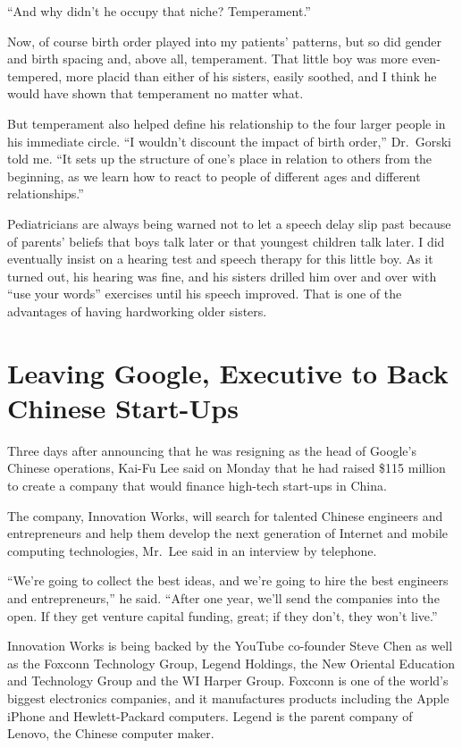﻿\documentclass[12pt]{article}
\begin{document}
``And why didn't he occupy that niche? Temperament.''

Now, of course birth order played into my patients' patterns, but so did gender and birth spacing
and, above all, temperament. That little boy was more even-tempered, more placid than either of his
sisters, easily soothed, and I think he would have shown that temperament no matter what.

But temperament also helped define his relationship to the four larger people in his immediate
circle. ``I wouldn't discount the impact of birth order,'' Dr.~Gorski told me. ``It sets up the
structure of one's place in relation to others from the beginning, as we learn how to react to
people of different ages and different relationships.''

Pediatricians are always being warned not to let a speech delay slip past because of parents'
beliefs that boys talk later or that youngest children talk later. I did eventually insist on a
hearing test and speech therapy for this little boy. As it turned out, his hearing was fine, and his
sisters drilled him over and over with ``use your words'' exercises until his speech improved. That
is one of the advantages of having hardworking older sisters.

\section{Leaving Google, Executive to Back Chinese Start-Ups}

Three days after announcing that he was resigning as the head of Google's Chinese operations, Kai-Fu
Lee said on Monday that he had raised \$115 million to create a company that would finance high-tech
start-ups in China.

The company, Innovation Works, will search for talented Chinese engineers and entrepreneurs and help
them develop the next generation of Internet and mobile computing technologies, Mr.~Lee said in an
interview by telephone.

``We're going to collect the best ideas, and we're going to hire the best engineers and
entrepreneurs,'' he said. ``After one year, we'll send the companies into the open. If they get
venture capital funding, great; if they don't, they won't live.''

Innovation Works is being backed by the YouTube co-founder Steve Chen as well as the Foxconn
Technology Group, Legend Holdings, the New Oriental Education and Technology Group and the WI Harper
Group. Foxconn is one of the world's biggest electronics companies, and it manufactures products
including the Apple iPhone and Hewlett-Packard computers. Legend is the parent company of Lenovo,
the Chinese computer maker.
\end{document}
